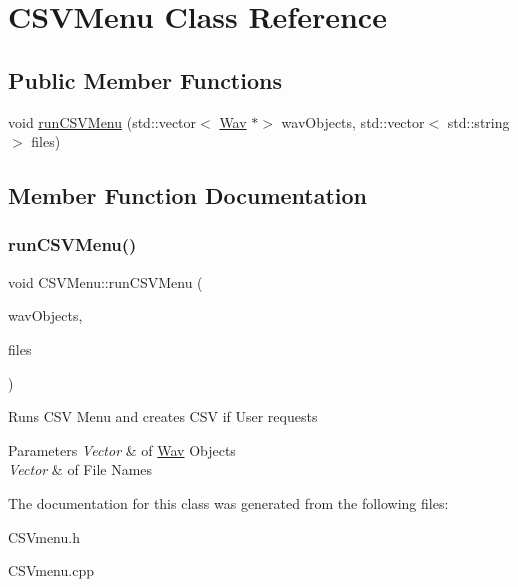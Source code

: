 \hypertarget{classCSVMenu}{}\section{C\+S\+V\+Menu Class Reference}
\label{classCSVMenu}
\subsection*{Public Member Functions}
\begin{DoxyCompactItemize}
\item 
void \hyperlink{classCSVMenu_aba617610caf0ba2148f139b60934357a}{run\+C\+S\+V\+Menu} (std\+::vector$<$ \hyperlink{classWav}{Wav} $\ast$$>$ wav\+Objects, std\+::vector$<$ std\+::string $>$ files)
\end{DoxyCompactItemize}


\subsection{Member Function Documentation}
\mbox{\label{classCSVMenu_aba617610caf0ba2148f139b60934357a}} 
\subsubsection{\texorpdfstring{run\+C\+S\+V\+Menu()}{runCSVMenu()}}
{\footnotesize\ttfamily void C\+S\+V\+Menu\+::run\+C\+S\+V\+Menu (\begin{DoxyParamCaption}\item[{std\+::vector$<$ \hyperlink{classWav}{Wav} $\ast$$>$}]{wav\+Objects,  }\item[{std\+::vector$<$ std\+::string $>$}]{files }\end{DoxyParamCaption})}

Runs C\+SV Menu and creates C\+SV if User requests


\begin{DoxyParams}{Parameters}
{\em Vector} & of \hyperlink{classWav}{Wav} Objects \\
\hline
{\em Vector} & of File Names \\
\hline
\end{DoxyParams}


The documentation for this class was generated from the following files\+:\begin{DoxyCompactItemize}
\item 
C\+S\+Vmenu.\+h\item 
C\+S\+Vmenu.\+cpp\end{DoxyCompactItemize}
